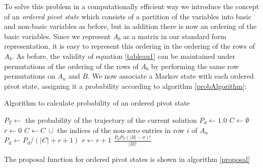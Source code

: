 To solve this problem in a computationally efficient way we introduce the concept of an \textit{ordered pivot state} which consists of a partition of the variables into basic and non-basic variables as before, but in addition there is now an ordering of the basic variables. Since we represent $A_b$ as a matrix in our standard form representation, it is easy to represent this ordering in the ordering of the rows of $A_b$. As before, the validity of equation \ref{tableau1} can be maintained under permutations of the ordering of the rows of $A_b$ by performing the same row permutations on $A_n$ and $B$. We now associate a Markov state with each ordered pivot state, assigning it a probability according to algorithm \ref{probAlgorithm}:

\begin{algorithm}
\caption{Algorithm to calculate probability of an ordered pivot state}
\label{probAlgorithm}
\begin{algorithmic}
 
\State $P_T \leftarrow$ the probability of the trajectory of the current solution
\State $P_d \leftarrow 1.0$
\State $C \leftarrow \emptyset$
\State $r \leftarrow 0$
	\State $C \leftarrow C \ \cup $ the indices of the non-zero entries in row $i$ of $A_n$
	\State $P_d \leftarrow P_d/(|C|+r+1)$
	\State $r \leftarrow r + 1$
  \EndIf
\EndFor
\State \Return $\frac{P_d P_T(|B|-\sigma)!}{|B|!}$
\EndFunction
\end{algorithmic}
\end{algorithm}

The proposal function for ordered pivot states is shown in algorithm \ref{proposal}

